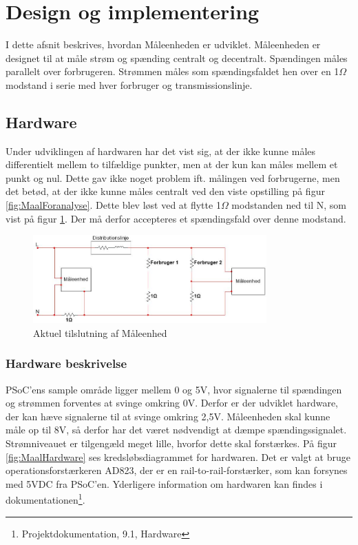 
\section{Design og implementering}
I dette afsnit beskrives, hvordan Måleenheden er udviklet. Måleenheden er designet til at måle strøm og spænding centralt og decentralt. Spændingen måles parallelt over forbrugeren. Strømmen måles som spændingsfaldet hen over en 1$\Omega$ modstand i serie med hver forbruger og transmissionslinje. 

\subsection{Hardware}

Under udviklingen af hardwaren har det vist sig, at der ikke kunne måles differentielt mellem to tilfældige punkter, men at der kun kan måles mellem et punkt og nul. Dette gav ikke noget problem ift. målingen ved forbrugerne, men det betød, at der ikke kunne måles centralt ved den viste opstilling på figur \ref{fig:MaalForanalyse}. Dette blev løst ved at flytte 1$\Omega$ modstanden ned til N, som vist på figur \ref{fig:MaalAktuel}. Der må derfor accepteres et spændingsfald over denne modstand.

\begin{figure}[H] %
	\centering
	\includegraphics[width=0.8\textwidth]{figure/MaalAktuel}
	\caption{Aktuel tilslutning af Måleenhed}
	\label{fig:MaalAktuel}
\end{figure} 


\subsubsection{Hardware beskrivelse}
PSoC'ens sample område ligger mellem 0 og 5V, hvor signalerne til spændingen og strømmen forventes at svinge omkring 0V. Derfor er der udviklet hardware, der kan hæve signalerne til at svinge omkring 2,5V. Måleenheden skal kunne måle op til 8V, så derfor har det været nødvendigt at dæmpe spændingssignalet. Strømniveauet er tilgengæld meget lille, hvorfor dette skal forstærkes. På figur \ref{fig:MaalHardware} ses kredsløbsdiagrammet for hardwaren. Det er valgt at bruge operationsforstærkeren AD823, der er en rail-to-rail-forstærker, som kan forsynes med 5VDC fra PSoC'en. Yderligere information om hardwaren kan findes i dokumentationen\footnote{Projektdokumentation, 9.1, Hardware}.  
  

